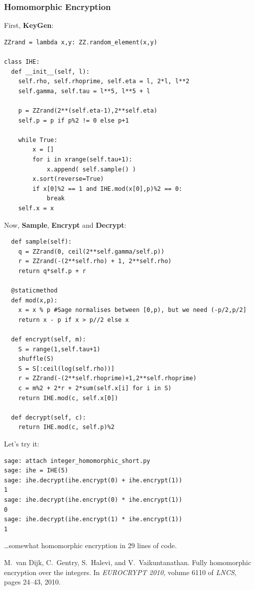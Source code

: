 \documentclass[10pt]{beamer}
\begin{document}
\begin{frame}
\frametitle{Homomorphic Encryption}

First, \textbf{KeyGen}:

\begin{lstlisting}
ZZrand = lambda x,y: ZZ.random_element(x,y)

class IHE:
  def __init__(self, l):
    self.rho, self.rhoprime, self.eta = l, 2*l, l**2
    self.gamma, self.tau = l**5, l**5 + l

    p = ZZrand(2**(self.eta-1),2**self.eta)
    self.p = p if p%2 != 0 else p+1

    while True:
        x = []
        for i in xrange(self.tau+1):
            x.append( self.sample() )
        x.sort(reverse=True)
        if x[0]%2 == 1 and IHE.mod(x[0],p)%2 == 0:
            break
    self.x = x
\end{lstlisting}

\framebreak

Now, \textbf{Sample}, \textbf{Encrypt} and \textbf{Decrypt}:

\begin{lstlisting}
  def sample(self):
    q = ZZrand(0, ceil(2**self.gamma/self.p))
    r = ZZrand(-(2**self.rho) + 1, 2**self.rho)
    return q*self.p + r

  @staticmethod
  def mod(x,p):
    x = x % p #Sage normalises between [0,p), but we need (-p/2,p/2]
    return x - p if x > p//2 else x

  def encrypt(self, m):
    S = range(1,self.tau+1)
    shuffle(S)
    S = S[:ceil(log(self.rho))]
    r = ZZrand(-(2**self.rhoprime)+1,2**self.rhoprime)
    c = m%2 + 2*r + 2*sum(self.x[i] for i in S)
    return IHE.mod(c, self.x[0])

  def decrypt(self, c):
    return IHE.mod(c, self.p)%2
\end{lstlisting}


\framebreak

Let's try it:

\begin{lstlisting}
sage: attach integer_homomorphic_short.py
sage: ihe = IHE(5)
sage: ihe.decrypt(ihe.encrypt(0) + ihe.encrypt(1))
1
sage: ihe.decrypt(ihe.encrypt(0) * ihe.encrypt(1))
0
sage: ihe.decrypt(ihe.encrypt(1) * ihe.encrypt(1))
1
\end{lstlisting}

\begin{flushright}
\dots somewhat homomorphic encryption in 29 lines of code.
\end{flushright}

\begin{thebibliography}{FOO}
M.\ van Dijk, C.\ Gentry, S.\ Halevi, and V.\ Vaikuntanathan.
\newblock Fully homomorphic encryption over the integers.
\newblock In {\em EUROCRYPT 2010}, volume 6110 of {\em LNCS}, pages 24--43, 2010.
\end{thebibliography}

\end{frame}
\end{document}
